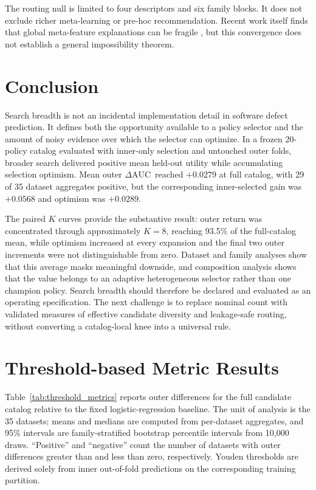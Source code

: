 \documentclass[referee]{USG}
\newcommand{\dauc}{\ensuremath{\Delta\mathrm{AUC}}}
\begin{document}
The routing null is limited to four descriptors and six family blocks. It does not exclude richer meta-learning or pre-hoc recommendation. Recent work itself finds that global meta-feature explanations can be fragile \cite{herre2026metafeatures}, but this convergence does not establish a general impossibility theorem.

\section{Conclusion}
Search breadth is not an incidental implementation detail in software defect prediction. It defines both the opportunity available to a policy selector and the amount of noisy evidence over which the selector can optimize. In a frozen 20-policy catalog evaluated with inner-only selection and untouched outer folds, broader search delivered positive mean held-out utility while accumulating selection optimism. Mean outer \dauc\ reached $+0.0279$ at full catalog, with 29 of 35 dataset aggregates positive, but the corresponding inner-selected gain was $+0.0568$ and optimism was $+0.0289$.

The paired $K$ curves provide the substantive result: outer return was concentrated through approximately $K=8$, reaching 93.5\% of the full-catalog mean, while optimism increased at every expansion and the final two outer increments were not distinguishable from zero. Dataset and family analyses show that this average masks meaningful downside, and composition analysis shows that the value belongs to an adaptive heterogeneous selector rather than one champion policy. Search breadth should therefore be declared and evaluated as an operating specification. The next challenge is to replace nominal count with validated measures of effective candidate diversity and leakage-safe routing, without converting a catalog-local knee into a universal rule.




\appendix
\section{Threshold-based Metric Results}
\label{app:threshold_metrics}

Table~\ref{tab:threshold_metrics} reports outer differences for the full candidate catalog relative to the fixed logistic-regression baseline. The unit of analysis is the 35 datasets; means and medians are computed from per-dataset aggregates, and 95\% intervals are family-stratified bootstrap percentile intervals from 10,000 draws. ``Positive'' and ``negative'' count the number of datasets with outer differences greater than and less than zero, respectively. Youden thresholds are derived solely from inner out-of-fold predictions on the corresponding training partition.
\end{document}
